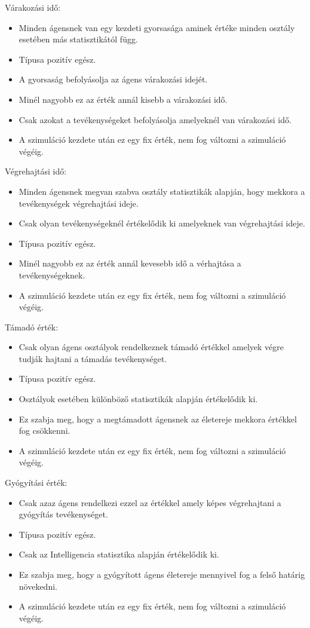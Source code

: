 \newpage

\noindent Várakozási idő:

\begin{itemize}
  \item Minden ágensnek van egy kezdeti gyorsasága aminek értéke minden osztály esetében más statisztikától függ.
  \item Típusa pozitív egész.
  \item A gyorsaság befolyásolja az ágens várakozási idejét.
  \item Minél nagyobb ez az érték annál kisebb a várakozási idő.
  \item Csak azokat a tevékenységeket befolyásolja amelyeknél van várakozási idő.
  \item A szimuláció kezdete után ez egy fix érték, nem fog változni a szimuláció végéig.
\end{itemize}

\noindent Végrehajtási idő:

\begin{itemize}
\item Minden ágensnek megvan szabva osztály statisztikák alapján, hogy mekkora a tevékenységek végrehajtási ideje.
\item Csak olyan tevékenységeknél értékelődik ki amelyeknek van végrehajtási ideje.
\item Típusa pozitív egész.
\item Minél nagyobb ez az érték annál kevesebb idő a vérhajtása a tevékenységeknek. 
\item A szimuláció kezdete után ez egy fix érték, nem fog változni a szimuláció végéig.
\end{itemize}

\noindent Támadó érték:
\begin{itemize}
\item Csak olyan ágens osztályok rendelkeznek támadó értékkel amelyek végre tudják hajtani a támadás tevékenységet.
\item Típusa pozitív egész.
\item Osztályok esetében különböző statisztikák alapján értékelődik ki.
\item Ez szabja meg, hogy a megtámadott ágensnek az életereje mekkora értékkel fog csökkenni.  
\item A szimuláció kezdete után ez egy fix érték, nem fog változni a szimuláció végéig.
\end{itemize}

\noindent Gyógyítási érték:
\begin{itemize}
\item Csak azaz ágens rendelkezi ezzel az értékkel amely képes végrehajtani a gyógyítás tevékenységet.
\item Típusa pozitív egész.
\item Csak az Intelligencia statisztika alapján értékelődik ki.
\item Ez szabja meg, hogy a gyógyított ágens életereje mennyivel fog a felső határig növekedni.
\item A szimuláció kezdete után ez egy fix érték, nem fog változni a szimuláció végéig.
\end{itemize}

